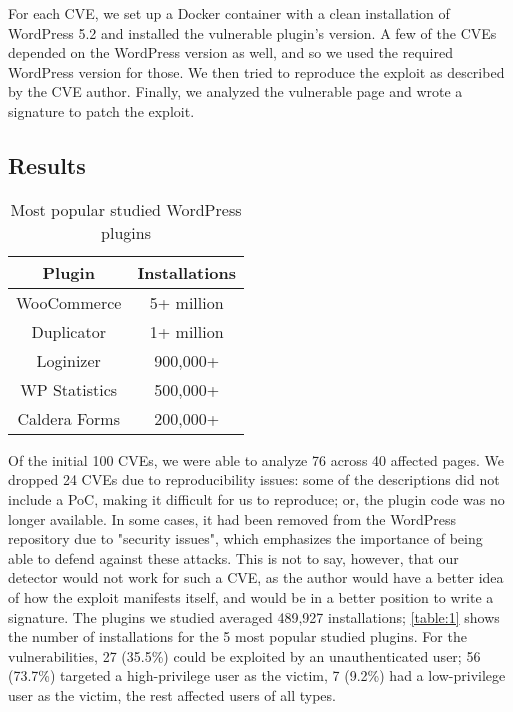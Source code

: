 For each CVE, we set up a Docker container with a clean installation of WordPress 5.2 and installed the vulnerable plugin's version. A few of the CVEs depended on the WordPress version as well, and so we used the required WordPress version for those. We then tried to reproduce the exploit as described by the CVE author. Finally, we analyzed the vulnerable page and wrote a signature to patch the exploit.

\subsection{Results}

\begin{table}[h!]
	\begin{center}
		\begin{tabular}{|c c|} 
			\hline
			Plugin & Installations\\ [1ex] 
			\hline
			WooCommerce  & 5+ million  \\  
			Duplicator & 1+ million \\  
			Loginizer & 900,000+ \\  
			WP Statistics & 500,000+ \\  
			Caldera Forms & 200,000+ \\   
			\hline
		\end{tabular}
		\caption{Most popular studied WordPress plugins}
		\label{table:1}
	\end{center}
\end{table}

Of the initial 100 CVEs, we were able to analyze 76 across 40 affected pages. We dropped 24 CVEs due to reproducibility issues: some of the descriptions did not include a PoC, making it difficult for us to reproduce; or, the plugin code was no longer available. In some cases, it had been removed from the WordPress repository due to "security issues", which emphasizes the importance of being able to defend against these attacks. This is not to say, however, that our detector would not work for such a CVE, as the author would have a better idea of how the exploit manifests itself, and would be in a better position to write a signature. The plugins we studied averaged 489,927 installations; \autoref{table:1} shows the number of installations for the 5 most popular studied plugins. For the vulnerabilities, 27 (35.5\%) could be exploited by an unauthenticated user; 56 (73.7\%) targeted a high-privilege user as the victim, 7 (9.2\%) had a low-privilege user as the victim, the rest affected users of all types.

